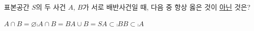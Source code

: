 표본공간 $S$의 두 사건 $A$, $B$가 서로 배반사건일 때, 다음 중 항상 옳은 것이 \underline{아닌} 것은?
\begin{choicesii}{$A\cap B=\varnothing$}{$\comp{A}\cap B=B$}{$A\cup B=S$}{$A\subset \comp{B}$}{$B\subset \comp{A}$}\end{choicesii}
